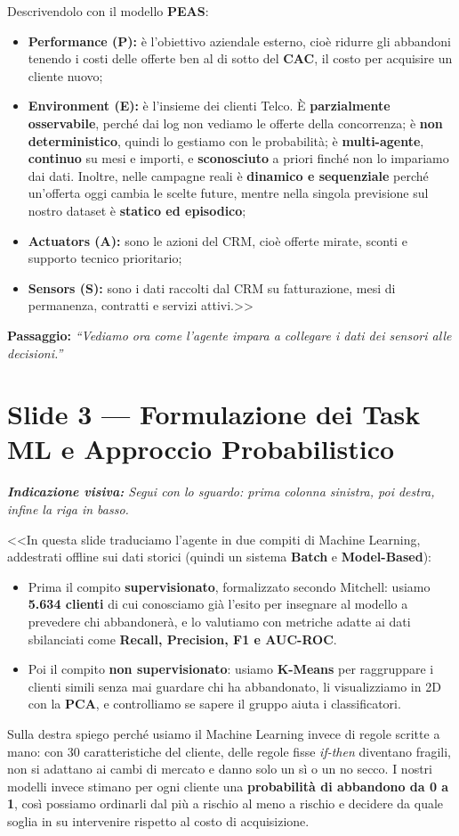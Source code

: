 \documentclass[10pt, a4paper]{article}
\newcommand{\cue}[1]{%
  \par\vspace{1pt}\noindent\colorbox{CueBg}{\parbox{\dimexpr\linewidth-2\fboxsep}{\footnotesize\textit{\color{PrimaryNavy}\textbf{Indicazione visiva:} #1}}}\par\vspace{2pt}%
}
\newcommand{\transition}[1]{%
  \par\vspace{1pt}\noindent\colorbox{LightBg}{\parbox{\dimexpr\linewidth-2\fboxsep}{\small\textbf{\color{SecondaryBlue}Passaggio:} \textit{``#1''}}}\par\vspace{2pt}%
}
\begin{document}
Descrivendolo con il modello \textbf{PEAS}:
\begin{itemize}
    \item \textbf{Performance (P):} è l'obiettivo aziendale esterno, cioè ridurre gli abbandoni tenendo i costi delle offerte ben al di sotto del \textbf{CAC}, il costo per acquisire un cliente nuovo;
    \item \textbf{Environment (E):} è l'insieme dei clienti Telco. È \textbf{parzialmente osservabile}, perché dai log non vediamo le offerte della concorrenza; è \textbf{non deterministico}, quindi lo gestiamo con le probabilità; è \textbf{multi-agente}, \textbf{continuo} su mesi e importi, e \textbf{sconosciuto} a priori finché non lo impariamo dai dati. Inoltre, nelle campagne reali è \textbf{dinamico e sequenziale} perché un'offerta oggi cambia le scelte future, mentre nella singola previsione sul nostro dataset è \textbf{statico ed episodico};
    \item \textbf{Actuators (A):} sono le azioni del CRM, cioè offerte mirate, sconti e supporto tecnico prioritario;
    \item \textbf{Sensors (S):} sono i dati raccolti dal CRM su fatturazione, mesi di permanenza, contratti e servizi attivi.>>
\end{itemize}
\transition{Vediamo ora come l'agente impara a collegare i dati dei sensori alle decisioni.}

\section*{Slide 3 --- Formulazione dei Task ML e Approccio Probabilistico}
\cue{Segui con lo sguardo: prima colonna sinistra, poi destra, infine la riga in basso.}
\noindent <<In questa slide traduciamo l'agente in due compiti di Machine Learning, addestrati offline sui dati storici (quindi un sistema \textbf{Batch} e \textbf{Model-Based}):
\begin{itemize}
    \item Prima il compito \textbf{supervisionato}, formalizzato secondo Mitchell: usiamo \textbf{5.634 clienti} di cui conosciamo già l'esito per insegnare al modello a prevedere chi abbandonerà, e lo valutiamo con metriche adatte ai dati sbilanciati come \textbf{Recall, Precision, F1 e AUC-ROC}.
    \item Poi il compito \textbf{non supervisionato}: usiamo \textbf{K-Means} per raggruppare i clienti simili senza mai guardare chi ha abbandonato, li visualizziamo in 2D con la \textbf{PCA}, e controlliamo se sapere il gruppo aiuta i classificatori.
\end{itemize}
Sulla destra spiego perché usiamo il Machine Learning invece di regole scritte a mano: con 30 caratteristiche del cliente, delle regole fisse \textit{if-then} diventano fragili, non si adattano ai cambi di mercato e danno solo un sì o un no secco. I nostri modelli invece stimano per ogni cliente una \textbf{probabilità di abbandono da 0 a 1}, così possiamo ordinarli dal più a rischio al meno a rischio e decidere da quale soglia in su intervenire rispetto al costo di acquisizione.
\end{document}
